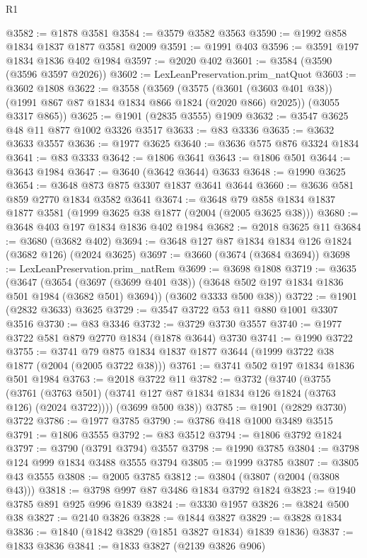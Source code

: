 \begin{lexlean}{R1}
\begin{coremodule}
@3582 := @1878 @3581
@3584 := @3579 @3582 @3563
@3590 := @1992 @858 @1834 @1837 @1877 @3581 @2009
@3591 := @1991 @403
@3596 := @3591 @197 @1834 @1836 @402 @1984
@3597 := @2020 @402
@3601 := @3584 (@3590 (@3596 @3597 @2026))
@3602 := LexLeanPreservation.prim_natQuot
@3603 := @3602 @1808
@3622 := @3558
    (@3569
      (@3575 (@3601 (@3603 @401 @38)) (@1991 @867 @87 @1834 @1834 @866 @1824 (@2020 @866) @2025))
      (@3055 @3317 @865))
@3625 := @1901 (@2835 @3555) @1909
@3632 := @3547 @3625 @48 @11 @877 @1002 @3326 @3517
@3633 := @83 @3336
@3635 := @3632 @3633 @3557
@3636 := @1977 @3625
@3640 := @3636 @575 @876 @3324 @1834
@3641 := @83 @3333
@3642 := @1806 @3641
@3643 := @1806 @501
@3644 := @3643 @1984
@3647 := @3640 (@3642 @3644) @3633
@3648 := @1990 @3625
@3654 := @3648 @873 @875 @3307 @1837 @3641 @3644
@3660 := @3636 @581 @859 @2770 @1834 @3582 @3641
@3674 := @3648 @79 @858 @1834 @1837 @1877 @3581 (@1999 @3625 @38 @1877 (@2004 (@2005 @3625 @38)))
@3680 := @3648 @403 @197 @1834 @1836 @402 @1984
@3682 := @2018 @3625 @11
@3684 := @3680 (@3682 @402)
@3694 := @3648 @127 @87 @1834 @1834 @126 @1824 (@3682 @126) (@2024 @3625)
@3697 := @3660 (@3674 (@3684 @3694))
@3698 := LexLeanPreservation.prim_natRem
@3699 := @3698 @1808
@3719 := @3635
    (@3647
      (@3654 (@3697 (@3699 @401 @38)) (@3648 @502 @197 @1834 @1836 @501 @1984 (@3682 @501) @3694))
      (@3602 @3333 @500 @38))
@3722 := @1901 (@2832 @3633) @3625
@3729 := @3547 @3722 @53 @11 @880 @1001 @3307 @3516
@3730 := @83 @3346
@3732 := @3729 @3730 @3557
@3740 := @1977 @3722 @581 @879 @2770 @1834 (@1878 @3644) @3730
@3741 := @1990 @3722
@3755 := @3741 @79 @875 @1834 @1837 @1877 @3644 (@1999 @3722 @38 @1877 (@2004 (@2005 @3722 @38)))
@3761 := @3741 @502 @197 @1834 @1836 @501 @1984
@3763 := @2018 @3722 @11
@3782 := @3732
    (@3740
      (@3755
        (@3761 (@3763 @501) (@3741 @127 @87 @1834 @1834 @126 @1824 (@3763 @126) (@2024 @3722))))
      (@3699 @500 @38))
@3785 := @1901 (@2829 @3730) @3722
@3786 := @1977 @3785
@3790 := @3786 @418 @1000 @3489 @3515
@3791 := @1806 @3555
@3792 := @83 @3512
@3794 := @1806 @3792 @1824
@3797 := @3790 (@3791 @3794) @3557
@3798 := @1990 @3785
@3804 := @3798 @124 @999 @1834 @3488 @3555 @3794
@3805 := @1999 @3785
@3807 := @3805 @43 @3555
@3808 := @2005 @3785
@3812 := @3804 (@3807 (@2004 (@3808 @43)))
@3818 := @3798 @997 @87 @3486 @1834 @3792 @1824
@3823 := @1940 @3785 @891 @925 @996 @1839
@3824 := @3330 @1957
@3826 := @3824 @500 @38
@3827 := @2140 @3826
@3828 := @1844 @3827
@3829 := @3828 @1834
@3836 := @1840 (@1842 @3829 (@1851 @3827 @1834) @1839 @1836)
@3837 := @1833 @3836
@3841 := @1833 @3827 (@2139 @3826 @906)

\end{coremodule}
\end{lexlean}
